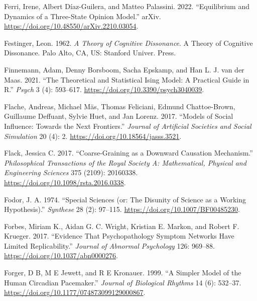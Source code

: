 \documentclass[
  letterpaper,
]{scrbook}
\newlength{\cslhangindent}
\newlength{\cslentryspacingunit} %
\newenvironment{CSLReferences}[2] %
 {%
  \setlength{\parindent}{0pt}
  \ifodd #1
  \let\oldpar\par
  \def\par{\hangindent=\cslhangindent\oldpar}
  \fi
  \setlength{\parskip}{#2\cslentryspacingunit}
 }%
 {}
\begin{document}
\begin{CSLReferences}{1}{0}
\leavevmode{}%
Ferri, Irene, Albert Díaz-Guilera, and Matteo Palassini. 2022.
{``Equilibrium and Dynamics of a Three-State Opinion Model.''} {arXiv}.
\url{https://doi.org/10.48550/arXiv.2210.03054}.

\leavevmode{}%
Festinger, Leon. 1962. \emph{A Theory of Cognitive Dissonance}. A Theory
of Cognitive Dissonance. {Palo Alto, CA, US}: {Stanford Univer. Press}.

\leavevmode{}%
Finnemann, Adam, Denny Borsboom, Sacha Epskamp, and Han L. J. van der
Maas. 2021. {``The Theoretical and Statistical Ising Model: A Practical
Guide in R.''} \emph{Psych} 3 (4): 593--617.
\url{https://doi.org/10.3390/psych3040039}.

\leavevmode{}%
Flache, Andreas, Michael Mäs, Thomas Feliciani, Edmund Chattoe-Brown,
Guillaume Deffuant, Sylvie Huet, and Jan Lorenz. 2017. {``Models of
{Social Influence}: {Towards} the {Next Frontiers}.''} \emph{Journal of
Artificial Societies and Social Simulation} 20 (4): 2.
\url{https://doi.org/10.18564/jasss.3521}.

\leavevmode{}%
Flack, Jessica C. 2017. {``Coarse-Graining as a Downward Causation
Mechanism.''} \emph{Philosophical Transactions of the Royal Society A:
Mathematical, Physical and Engineering Sciences} 375 (2109): 20160338.
\url{https://doi.org/10.1098/rsta.2016.0338}.

\leavevmode{}%
Fodor, J. A. 1974. {``Special Sciences (or: {The} Disunity of Science as
a Working Hypothesis).''} \emph{Synthese} 28 (2): 97--115.
\url{https://doi.org/10.1007/BF00485230}.

\leavevmode{}%
Forbes, Miriam K., Aidan G. C. Wright, Kristian E. Markon, and Robert F.
Krueger. 2017. {``Evidence That Psychopathology Symptom Networks Have
Limited Replicability.''} \emph{Journal of Abnormal Psychology} 126:
969--88. \url{https://doi.org/10.1037/abn0000276}.

\leavevmode{}%
Forger, D B, M E Jewett, and R E Kronauer. 1999. {``A Simpler Model of
the Human Circadian Pacemaker.''} \emph{Journal of Biological Rhythms}
14 (6): 532--37. \url{https://doi.org/10.1177/074873099129000867}.


\end{CSLReferences}
\end{document}
